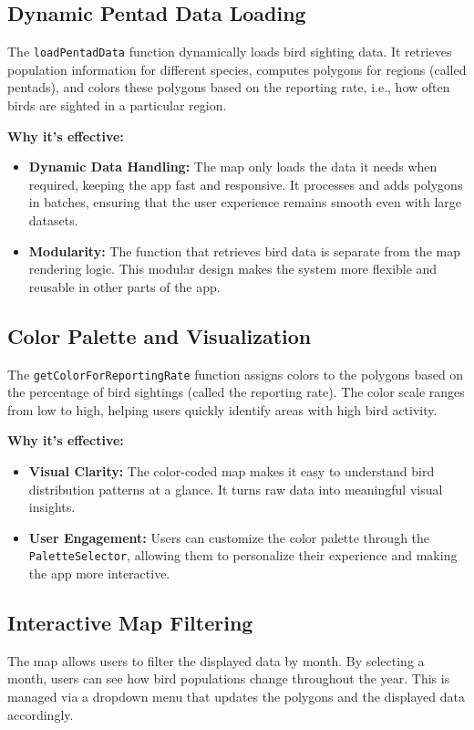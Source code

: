 \documentclass[a4paper]{article}
\begin{document}
\subsection{Dynamic Pentad Data Loading}
The \texttt{loadPentadData} function dynamically loads bird sighting data. It retrieves population information for different species, computes polygons for regions (called pentads), and colors these polygons based on the reporting rate, i.e., how often birds are sighted in a particular region.

\textbf{Why it's effective:}
\begin{itemize}
    \item \textbf{Dynamic Data Handling:} The map only loads the data it needs when required, keeping the app fast and responsive. It processes and adds polygons in batches, ensuring that the user experience remains smooth even with large datasets.
    \item \textbf{Modularity:} The function that retrieves bird data is separate from the map rendering logic. This modular design makes the system more flexible and reusable in other parts of the app.
\end{itemize}

\subsection{Color Palette and Visualization}
The \texttt{getColorForReportingRate} function assigns colors to the polygons based on the percentage of bird sightings (called the reporting rate). The color scale ranges from low to high, helping users quickly identify areas with high bird activity.

\textbf{Why it's effective:}
\begin{itemize}
    \item \textbf{Visual Clarity:} The color-coded map makes it easy to understand bird distribution patterns at a glance. It turns raw data into meaningful visual insights.
    \item \textbf{User Engagement:} Users can customize the color palette through the \texttt{PaletteSelector}, allowing them to personalize their experience and making the app more interactive.
\end{itemize}

\subsection{Interactive Map Filtering}
The map allows users to filter the displayed data by month. By selecting a month, users can see how bird populations change throughout the year. This is managed via a dropdown menu that updates the polygons and the displayed data accordingly.
\end{document}
